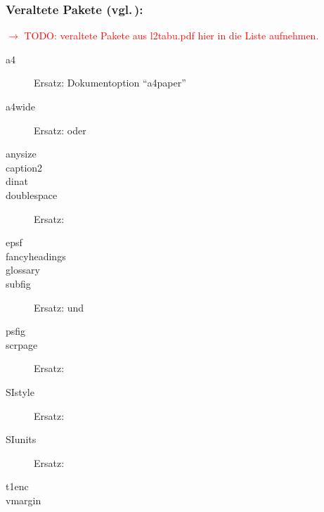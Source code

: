 \noindent \subsubsection*{Veraltete Pakete (vgl.\,\cite{l2tabu}):}
\indent\textcolor{red}{$\rightarrow$ TODO: veraltete Pakete aus l2tabu.pdf hier in die Liste aufnehmen.}
	\negAbstand
{
\begin{multicols}{2}
\begin{description}
	\item[a4] Ersatz: Dokumentoption "`a4paper"'
	\item[a4wide] Ersatz:  oder 
	\item[anysize]
	\item[caption2]
	\item[dinat]
	\item[doublespace] Ersatz: 
	\item[epsf]
	\item[fancyheadings]
	\item[glossary]
	\item[{subfig}] Ersatz:  und 
	\item[psfig]
	\item[scrpage] Ersatz: 
	\item[SIstyle] Ersatz: 
	\item[SIunits] Ersatz: 
	\item[t1enc]
	\item[vmargin]
\end{description}
\addtolength{\leftmargini}{20pt}
\end{multicols}
}\color{black}
